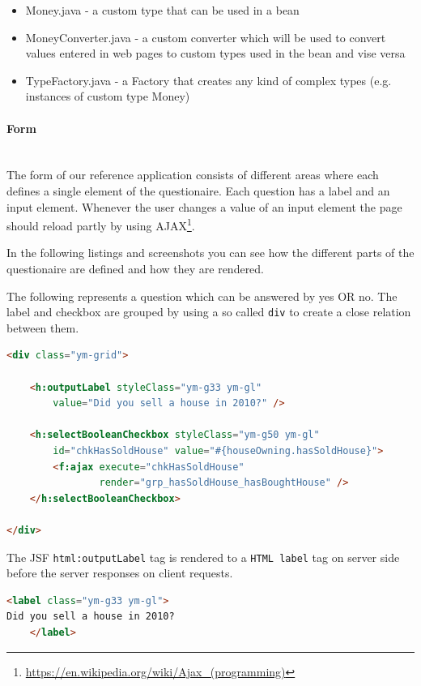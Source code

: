 \begin{itemize}
\item Money.java - a custom type that can be used in a bean
\item MoneyConverter.java - a custom converter which will be used to convert
values entered in web pages to custom types used in the bean and vise versa
\item TypeFactory.java - a Factory that creates any kind of complex types (e.g.
instances of custom type Money)
\end{itemize} 


\paragraph{Form} $\;$ \\
The form of our reference application consists of different areas where each
defines a single element of the questionaire. Each question has a label and an input element. Whenever the user
changes a value of an input element the page should reload partly by using
AJAX\footnote{\url{https://en.wikipedia.org/wiki/Ajax\_(programming)}}.

In the following listings and screenshots you can see how the different parts
of the questionaire are defined and how they are rendered. 

The following represents a question which can be answered by yes OR no. The
label and checkbox are grouped by using a so called \texttt{div} to create a close relation
between them.

\begin{lstlisting}[language=HTML]
<div class="ym-grid">

	<h:outputLabel styleClass="ym-g33 ym-gl"
		value="Did you sell a house in 2010?" />

	<h:selectBooleanCheckbox styleClass="ym-g50 ym-gl"
		id="chkHasSoldHouse" value="#{houseOwning.hasSoldHouse}">
		<f:ajax execute="chkHasSoldHouse"
				render="grp_hasSoldHouse_hasBoughtHouse" />
	</h:selectBooleanCheckbox>

</div>
\end{lstlisting}

The JSF \texttt{html:outputLabel} tag is rendered to a \texttt{HTML
label} tag on server side before the server responses on client requests. 

\begin{lstlisting}[language=HTML]
<label class="ym-g33 ym-gl">
Did you sell a house in 2010?
    </label>
\end{lstlisting}

